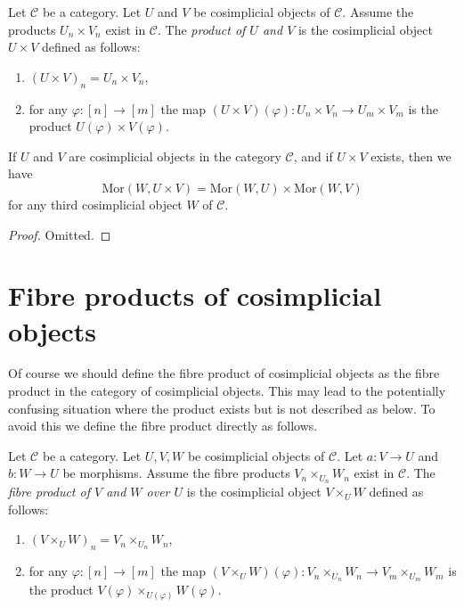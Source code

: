 \begin{definition}
\label{definition-product-cosimplicial-objects}
Let $\mathcal{C}$ be a category.
Let $U$ and $V$ be cosimplicial objects of $\mathcal{C}$.
Assume the products $U_n \times V_n$ exist in $\mathcal{C}$.
The {\it product of $U$ and $V$} is the cosimplicial object
$U\times V$ defined as follows:
\begin{enumerate}
\item $(U \times V)_n = U_n \times V_n$,
\item for any $\varphi : [n] \to [m]$ the map
$(U \times V)(\varphi) : U_n \times V_n \to U_m \times V_m$
is the product $U(\varphi) \times V(\varphi)$.
\end{enumerate}
\end{definition}

\begin{lemma}
\label{lemma-product-cosimplicial-objects}
If $U$ and $V$ are cosimplicial objects in the category $\mathcal{C}$,
and if $U\times V$ exists, then we have
$$
\text{Mor}(W, U\times V) =
\text{Mor}(W, U) \times
\text{Mor}(W, V)
$$
for any third cosimplicial object $W$ of $\mathcal{C}$.
\end{lemma}

\begin{proof}
Omitted.
\end{proof}

\section{Fibre products of cosimplicial objects}
\label{section-fibre-products-cosimplicial}

\noindent
Of course we should define the fibre product of cosimplicial objects
as the fibre product in the category of cosimplicial objects. This
may lead to the potentially confusing situation where the product exists
but is not described as below. To avoid this we define the fibre product
directly as follows.

\begin{definition}
\label{definition-fibre-product-cosimplicial-objects}
Let $\mathcal{C}$ be a category.
Let $U, V, W$ be cosimplicial objects of $\mathcal{C}$.
Let $a : V \to U$ and $b : W \to U$ be morphisms.
Assume the fibre products $V_n \times_{U_n} W_n$ exist in $\mathcal{C}$.
The {\it fibre product of $V$ and $W$ over $U$} is the cosimplicial object
$V\times_U W$ defined as follows:
\begin{enumerate}
\item $(V \times_U W)_n = V_n \times_{U_n} W_n$,
\item for any $\varphi : [n] \to [m]$ the map
$(V \times_U W)(\varphi) : V_n \times_{U_n} W_n \to V_m \times_{U_m} W_m$
is the product $V(\varphi) \times_{U(\varphi)} W(\varphi)$.
\end{enumerate}
\end{definition}

